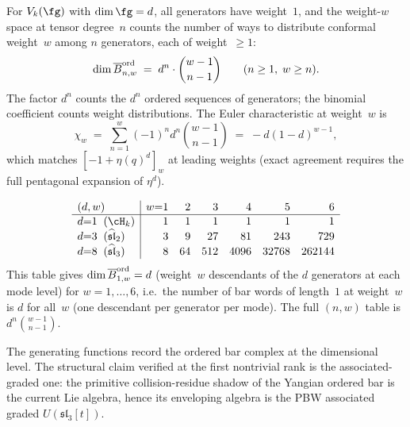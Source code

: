 \begin{computation}
\label{comp:affine-generator-dims}
For $V_k(\fg)$ with $\dim\fg=d$, all generators have
weight~$1$, and the weight-$w$ space at tensor degree~$n$
counts the number of ways to distribute conformal
weight~$w$ among $n$ generators, each of weight~$\ge 1$:
\[
\dim\overline{B}^{\mathrm{ord}}_{n,w}
\;=\;
d^n\cdot\binom{w-1}{n-1}
\qquad
(n\ge 1,\;w\ge n).
\]
The factor $d^n$ counts the $d^n$ ordered sequences of
generators; the binomial coefficient counts weight
distributions. The Euler characteristic at weight~$w$ is
\[
\chi_w
\;=\;
\sum_{n=1}^w (-1)^n d^n\binom{w-1}{n-1}
\;=\;
-d(1-d)^{w-1},
\]
which matches $[-1+\eta(q)^d]_w$ at leading weights
(exact agreement requires the full pentagonal expansion
of $\eta^d$).

\[
\renewcommand{\arraystretch}{1.05}
\begin{array}{l|rrrrrr}
(d,w) & w{=}1 & 2 & 3 & 4 & 5 & 6 \\
\hline
d{=}1\;\;(\cH_k) & 1 & 1 & 1 & 1 & 1 & 1 \\
d{=}3\;\;(\widehat{\mathfrak{sl}}_2) & 3 & 9 & 27 & 81 & 243 & 729 \\
d{=}8\;\;(\widehat{\mathfrak{sl}}_3) & 8 & 64 & 512 & 4096 & 32768 & 262144
\end{array}
\]
This table gives $\dim\overline{B}^{\mathrm{ord}}_{1,w}=d$
(weight~$w$ descendants of the $d$ generators at each mode level)
for $w=1,\ldots,6$, i.e.\ the number of bar words of
length~$1$ at weight~$w$ is $d$ for all~$w$ (one descendant per
generator per mode). The full $(n,w)$ table is
$d^n\binom{w-1}{n-1}$.
\end{computation}

The generating functions record the ordered bar complex at the
dimensional level. The structural claim verified at the first
nontrivial rank is the associated-graded one: the primitive
collision-residue shadow of the Yangian ordered bar is the current
Lie algebra, hence its enveloping algebra is the PBW associated graded
\(U(\mathfrak{sl}_3[t])\).


